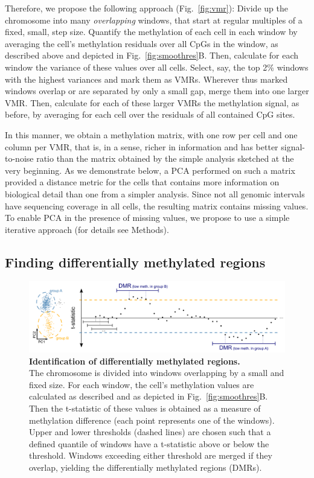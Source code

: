 \documentclass[twocolumn,10pt]{article}
\begin{document}
Therefore, we propose the following approach (Fig.~\ref{fig:vmr}): Divide up the chromosome into many \emph{overlapping} windows, that start at regular multiples of a fixed, small, step size.
Quantify the methylation of each cell in each window by averaging the cell's methylation residuals over all CpGs in the window, as described above and depicted in Fig.~\ref{fig:smoothres}B.
Then, calculate for each window the variance of these values over all cells.
Select, say, the top 2\% windows with the highest variances and mark them as VMRs.
Wherever thus marked windows overlap or are separated by only a small gap, merge them into one larger VMR.
Then, calculate for each of these larger VMRs the methylation signal, as before, by averaging for each cell over the residuals of all contained CpG sites.

In this manner, we obtain a methylation matrix, with one row per cell and one column per VMR, that is, in a sense, richer in information and has better signal-to-noise ratio than the matrix obtained by the simple analysis sketched at the very beginning.
As we demonstrate below, a PCA performed on such a matrix provided a distance metric for the cells that contains more information on biological detail than one from a simpler analysis.
Since not all genomic intervals have sequencing coverage in all cells, the resulting matrix contains missing values.
To enable PCA in the presence of missing values, we propose to use a simple iterative approach (for details see Methods).

\subsection{Finding differentially methylated regions}

\begin{figure}
    \begin{center}
    \includegraphics[width=.65\textwidth]{figures/Fig_DMRdetection.png}
    \end{center}
    \caption{\small \textbf{Identification of differentially methylated regions.}\\
    The chromosome is divided into windows overlapping by a small and fixed size.
    For each window, the cell’s methylation values are calculated as described and as depicted in Fig.~\ref{fig:smoothres}B.
    Then the t-statistic of these values is obtained as a measure of methylation difference (each point represents one of the windows).
    Upper and lower thresholds (dashed lines) are chosen such that a defined quantile of windows have a t-statistic above or below the threshold.
    Windows exceeding either threshold are merged if they overlap, yielding the differentially methylated regions (DMRs).}
    \label{fig:dmrscan}
\end{figure}
\end{document}
